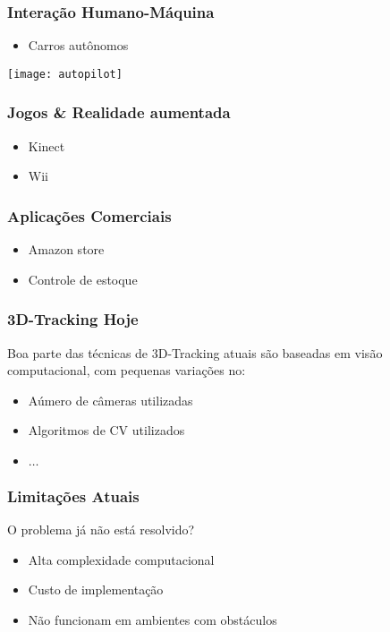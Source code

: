\begin{frame}
  \frametitle{Interação Humano-Máquina}
  \begin{itemize}
    \item  Carros autônomos
  \end{itemize}

  \begin{center}
    \texttt{[image: autopilot]}
  \end{center}
\end{frame}

\begin{frame}
\frametitle{Jogos \& Realidade aumentada}
  \begin{itemize}
    \item  Kinect
    \item  Wii
  \end{itemize}
\end{frame}

\begin{frame}
  \frametitle{Aplicações Comerciais}
  \begin{itemize}
    \item  Amazon store
    \item  Controle de estoque
  \end{itemize}
\end{frame}

\begin{frame}
  \frametitle{3D-Tracking Hoje}

  Boa parte das técnicas de 3D-Tracking atuais são baseadas em visão
  computacional, com pequenas variações no:

  \begin{itemize}
    \item Aúmero de câmeras utilizadas
    \item Algoritmos de CV utilizados
    \item $\dots$
  \end{itemize}
\end{frame}

\begin{frame}
  \frametitle{Limitações Atuais}

  O problema já não está resolvido?

  \begin{itemize}
    \item  Alta complexidade computacional
    \item  Custo de implementação
    \item  Não funcionam em ambientes com obstáculos
  \end{itemize}
\end{frame}


